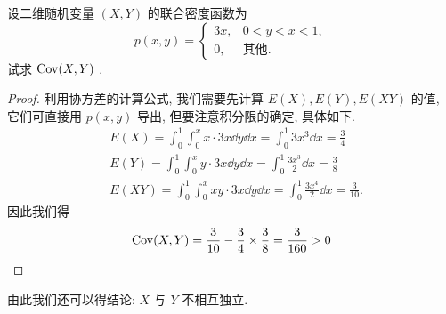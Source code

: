 	\begin{example}\label{exam:3.4.7}
		设二维随机变量 $(X,Y)$ 的联合密度函数为
		\begin{equation*}
			p(x,y)=\begin{cases}
				3x, & 0<y<x<1, \\
				0, & \text{其他}.
			\end{cases}
		\end{equation*}
		试求 $\operatorname{Cov}(X, Y)$ .
		\begin{proof}
			利用协方差的计算公式, 我们需要先计算 $E(X),E(Y),E(XY)$ 的值, 它们可直接用 $p(x,y)$ 导出, 但要注意积分限的确定, 具体如下.
			\begin{align*}
				&E(X)=\int_{0}^{1} \int_{0}^{x} x \cdot 3 x \dd y \dd x=\int_{0}^{1} 3 x^{3} \dd x=\frac{3}{4} \\
				&E(Y)=\int_{0}^{1} \int_{0}^{x} y \cdot 3 x \dd y \dd x=\int_{0}^{1} \frac{3 x^{3}}{2} \dd x=\frac{3}{8} \\
				&E(X Y)=\int_{0}^{1} \int_{0}^{x} x y \cdot 3 x \dd y \dd x=\int_{0}^{1} \frac{3 x^{4}}{2} \dd x=\frac{3}{10}.
			\end{align*}
			因此我们得
			\begin{equation*}
				\operatorname{Cov}(X, Y)=\frac{3}{10}-\frac{3}{4} \times \frac{3}{8}=\frac{3}{160}>0
			\end{equation*}
		\end{proof}
		由此我们还可以得结论: $X$ 与 $Y$ 不相互独立.
	\end{example}

